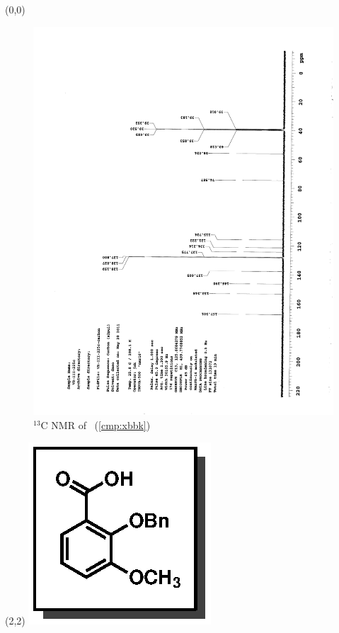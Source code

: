\clearpage
\begin{textblock}{20}(0,0)
\begin{figure}[htb]
\caption{$^{13}$C NMR of  \CMPxbbk\ (\ref{cmp:xbbk})}
\includegraphics[scale=0.75, trim = 0mm 0mm 0mm 5mm,
clip]{chp_singlecarbon/images/nmr/xbbkC}
\vspace{-100pt}
\end{figure}
\end{textblock}
\begin{textblock}{1}(2,2)
\includegraphics[scale=0.8, angle=90]{chp_singlecarbon/images/xbbk}
\end{textblock}
\clearpage

